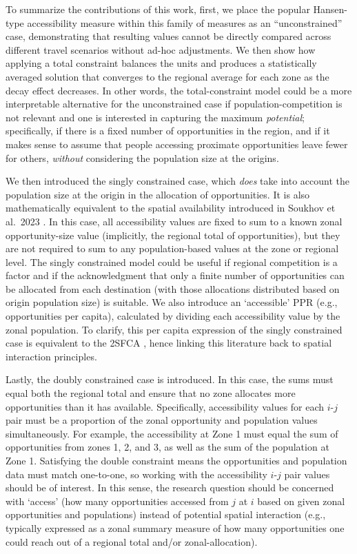 \documentclass[
  10pt,
  letterpaper,
]{article}
\begin{document}
To summarize the contributions of this work, first, we place the popular
Hansen-type accessibility measure \citep{hansen1959} within this family
of measures as an ``unconstrained'' case, demonstrating that resulting
values cannot be directly compared across different travel scenarios
without ad-hoc adjustments. We then show how applying a total constraint
balances the units and produces a statistically averaged solution that
converges to the regional average for each zone as the decay effect
decreases. In other words, the total-constraint model could be a more
interpretable alternative for the unconstrained case if
population-competition is not relevant and one is interested in
capturing the maximum \emph{potential}; specifically, if there is a
fixed number of opportunities in the region, and if it makes sense to
assume that people accessing proximate opportunities leave fewer for
others, \emph{without} considering the population size at the origins.

We then introduced the singly constrained case, which \emph{does} take
into account the population size at the origin in the allocation of
opportunities. It is also mathematically equivalent to the spatial
availability introduced in Soukhov et al.~2023
\citep{soukhovIntroducingSpatialAvailability2023}. In this case, all
accessibility values are fixed to sum to a known zonal opportunity-size
value (implicitly, the regional total of opportunities), but they are
not required to sum to any population-based values at the zone or
regional level. The singly constrained model could be useful if regional
competition is a factor and if the acknowledgment that only a finite
number of opportunities can be allocated from each destination (with
those allocations distributed based on origin population size) is
suitable. We also introduce an `accessible' PPR (e.g., opportunities per
capita), calculated by dividing each accessibility value by the zonal
population. To clarify, this per capita expression of the singly
constrained case is equivalent to the 2SFCA \citep{luo2003, shen1998},
hence linking this literature back to spatial interaction principles.

Lastly, the doubly constrained case is introduced. In this case, the
sums must equal both the regional total and ensure that no zone
allocates more opportunities than it has available. Specifically,
accessibility values for each \(i\)-\(j\) pair must be a proportion of
the zonal opportunity and population values simultaneously. For example,
the accessibility at Zone 1 must equal the sum of opportunities from
zones 1, 2, and 3, as well as the sum of the population at Zone 1.
Satisfying the double constraint means the opportunities and population
data must match one-to-one, so working with the accessibility
\(i\)-\(j\) pair values should be of interest. In this sense, the
research question should be concerned with `access' (how many
opportunities accessed from \(j\) at \(i\) based on given zonal
opportunities and populations) instead of potential spatial interaction
(e.g., typically expressed as a zonal summary measure of how many
opportunities one could reach out of a regional total and/or
zonal-allocation).
\end{document}
